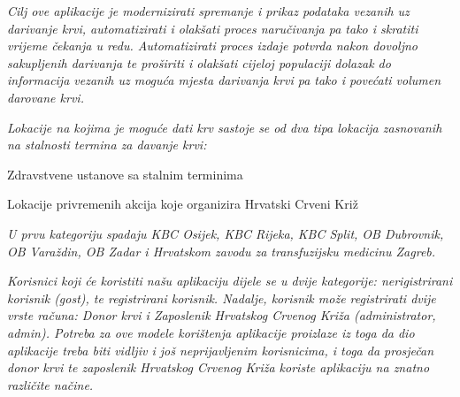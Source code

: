 		\textit{Cilj ove aplikacije je modernizirati spremanje i prikaz podataka vezanih uz darivanje krvi, automatizirati i olakšati proces naručivanja pa tako i skratiti vrijeme čekanja u redu. Automatizirati proces izdaje potvrda nakon dovoljno sakupljenih darivanja te proširiti i olakšati cijeloj populaciji dolazak do informacija vezanih uz moguća mjesta darivanja krvi pa tako i povećati volumen darovane krvi.}

		\textit{Lokacije na kojima je moguće dati krv sastoje se od dva tipa lokacija zasnovanih na stalnosti termina za davanje krvi:}
		\begin{packed_enum}

					\item Zdravstvene ustanove sa stalnim terminima
					\item Lokacije privremenih akcija koje organizira Hrvatski Crveni Križ

		\end{packed_enum}

		\textit{U prvu kategoriju spadaju KBC Osijek, KBC Rijeka, KBC
		Split, OB Dubrovnik, OB Varaždin, OB Zadar i Hrvatskom zavodu za transfuzijsku medicinu Zagreb. }

		\textit{Korisnici koji će koristiti našu aplikaciju dijele se u dvije kategorije: nerigistrirani korisnik (gost), te registrirani korisnik. Nadalje, korisnik može registrirati dvije vrste računa: Donor krvi i Zaposlenik Hrvatskog Crvenog Križa (administrator, admin). Potreba za ove modele korištenja aplikacije proizlaze iz toga da dio aplikacije treba biti vidljiv i još neprijavljenim korisnicima, i toga da prosječan donor krvi te zaposlenik Hrvatskog Crvenog Križa koriste aplikaciju na znatno različite načine.}

